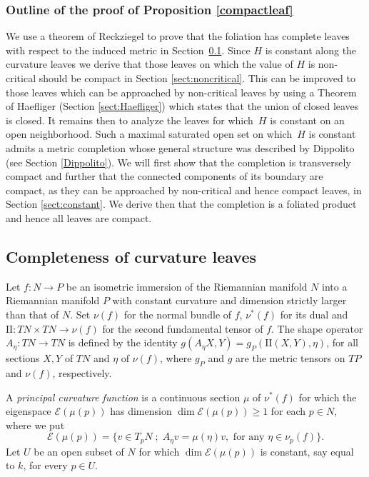 \documentclass[10pt]{amsart}
\let\mathcal\mathscr
\newcommand{\II}{\mathrm{II}}
\newcommand{\sep}{\;;\;}
\theoremstyle{definition}
\theoremstyle{remark}
\numberwithin{equation}{section}
\begin{document}
\subsubsection*{Outline of the proof of Proposition \ref{compactleaf}}
We use a theorem of Reckziegel to prove that the foliation has complete leaves
with respect to the induced metric in Section~\ref{sect:Reckziegel}. Since $H$ is constant along the curvature leaves we derive that those
leaves on which the value of $H$ is non-critical should be compact in Section \ref{sect:noncritical}. This can be improved
to those leaves which can be approached by non-critical leaves by using a Theorem of Haefliger (Section \ref{sect:Haefliger}) which states that
the union of closed leaves is closed. It remains then to analyze the leaves for which~$H$ is constant on an open neighborhood.
Such a maximal saturated open set on which~$H$ is constant admits a metric completion whose general structure was
described by Dippolito (see Section \ref{Dippolito}). We will first show that the completion is transversely compact and further that
the connected components of its boundary are compact, as they can be approached by non-critical and hence compact leaves, in Section \ref{sect:constant}. We derive then that the completion is a foliated product and hence all leaves are compact.

\subsection{Completeness of curvature leaves}\label{sect:Reckziegel}
Let $f:N\to P$ be an isometric immersion of the Riemannian manifold $N$ into a Riemannian manifold $P$ with constant curvature and dimension strictly larger than that of $N$.
Set $\nu(f)$ for the normal bundle of $f$, $\nu^*(f)$ for its dual and $\II:TN\times TN \to \nu(f)$ for the second fundamental tensor of $f$.
The shape operator $A_{\eta}:TN\to TN$ is defined by the identity
$g(A_{\eta}X,Y)=g_P(\II(X,Y),\eta)$, for all sections $X,Y$ of $TN$ and $\eta$ of $\nu(f)$, where $g_P$ and $g$ are the metric tensors on $TP$ and $\nu(f)$, respectively.

A \emph{principal curvature function} is a continuous section $\mu$ of $\nu^*(f)$ for which the eigenspace $\mathcal E(\mu(p))$ has dimension
$\dim \mathcal E(\mu(p))\geq 1$ for each $p\in N$, where we put
\[ \mathcal E(\mu(p))= \{ v \in T_pN\sep A_{\eta} v= \mu(\eta) v,\text{ for any } \eta\in \nu_p(f)\}.\]
Let $U$ be an open subset of $N$ for which $\dim \mathcal E(\mu(p))$ is constant, say equal to $k$, for every $p\in U$.
\end{document}
